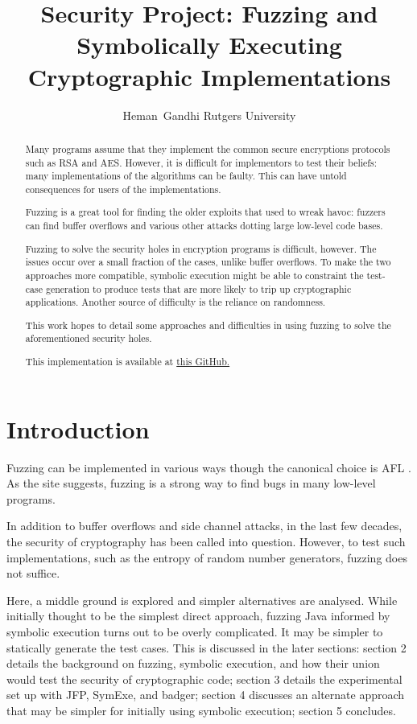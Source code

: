 \documentclass[letterpaper,twocolumn,10pt]{article}
\title{\Large \bf Security Project: Fuzzing and Symbolically Executing Cryptographic Implementations}
\date{}
\author{\rm{Heman\ Gandhi} Rutgers University}
\begin{document}


\maketitle

\begin{abstract}
Many programs assume that they implement the common secure encryptions
protocols such as RSA and AES. However, it is difficult for implementors
to test their beliefs: many implementations of the algorithms can be faulty.
This can have untold consequences for users of the implementations.

Fuzzing is a great tool for finding the older exploits that used to wreak
havoc: fuzzers can find buffer overflows and various other attacks dotting
large low-level code bases.

Fuzzing to solve the security holes in encryption programs is difficult, however.
The issues occur over a small fraction of the cases, unlike buffer overflows.
To make the two approaches more compatible, symbolic execution might be able to
constraint the test-case generation to produce tests that are more likely to trip
up cryptographic applications. Another source of difficulty is the reliance on randomness.

This work hopes to detail some approaches and difficulties in using fuzzing to solve
the aforementioned security holes.

This implementation is available at \href{https://github.com/hemangandhi/comp-sec-final-project}{this GitHub.}
\end{abstract}

\section{Introduction}

Fuzzing can be implemented in various ways though the canonical choice
is AFL \cite{AFL}. As the site suggests, fuzzing is a strong way to find
bugs in many low-level programs.

In addition to buffer overflows and side channel attacks, in the last
few decades, the security of cryptography has been called into question.
\cite{miningPQ} However, to test such implementations, such as the entropy
of random number generators, fuzzing does not suffice.

Here, a middle ground is explored and simpler alternatives are analysed.
While initially thought to be the simplest direct approach, fuzzing Java
informed by symbolic execution turns out to be overly complicated. It
may be simpler to statically generate the test cases. This is discussed in
the later sections: section 2 details the background on fuzzing, symbolic
execution, and how their union would test the security of cryptographic
code; section 3 details the experimental set up with JFP, SymExe, and badger;
section 4 discusses an alternate approach that may be simpler for initially
using symbolic execution; section 5 concludes.
\end{document}
